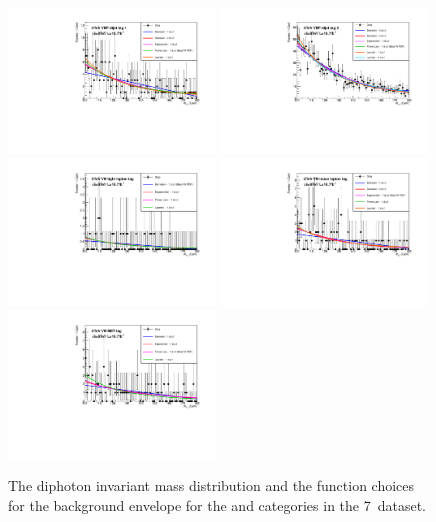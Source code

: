 \begin{figure}
  \includegraphics[width=0.49\textwidth]{analysis/plots/multipdf_plots/cat6_8TeV.pdf}
  \includegraphics[width=0.49\textwidth]{analysis/plots/multipdf_plots/cat7_8TeV.pdf}\\
  \includegraphics[width=0.49\textwidth]{analysis/plots/multipdf_plots/cat8_8TeV.pdf}
  \includegraphics[width=0.49\textwidth]{analysis/plots/multipdf_plots/cat9_8TeV.pdf}\\
  \includegraphics[width=0.49\textwidth]{analysis/plots/multipdf_plots/cat10_8TeV.pdf}
  \caption{The diphoton invariant mass distribution and the function choices for the background envelope for the \VH and \ttH categories in the 7~\TeV dataset.}
  \label{fig:multipdf3}
\end{figure}

